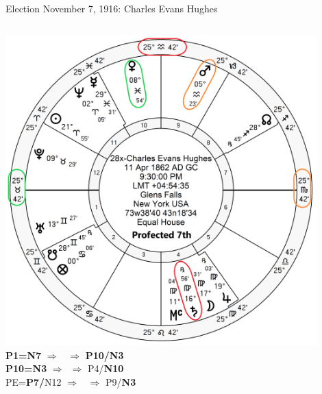 \begin{frame}[t]{Election November 7, 1916: Charles Evans Hughes}
\begin{columns}[T, onlytextwidth]
\vspace{-1em}
{\includegraphics[width=0.9\textwidth]{charts/Hughes-Prof-7th.png}}
\textbf{\dgreen P1=N7} 
	$\Rightarrow$ \Venus\, $\Rightarrow$ \textbf{\red P10/N3}\\
\textbf{\red P10=N3}
	$\Rightarrow$ \Saturn\,\Retrograde $\Rightarrow$ P4/\textbf{\red N10}\\
PE=\textbf{\dgreen P7/}N12
	$\Rightarrow$ \Mars\, $\Rightarrow$ P9/\textbf{\red N3}


\end{columns}
\end{frame}

